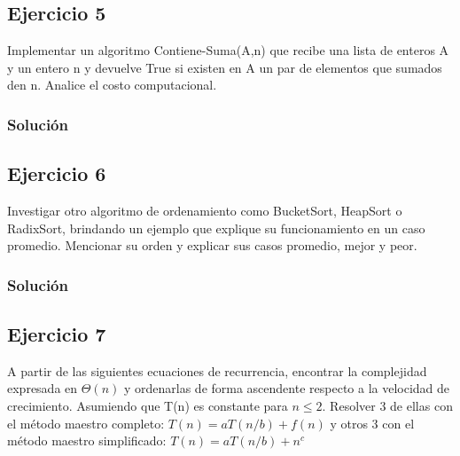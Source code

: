 \documentclass{article}
\begin{document}
\subsection*{Ejercicio 5}
Implementar un algoritmo Contiene-Suma(A,n) que recibe una lista de enteros A y un entero n y devuelve True si existen en A un par de elementos que sumados den n. Analice el costo computacional.

\subsubsection*{Solución}


\subsection*{Ejercicio 6}
Investigar otro algoritmo de ordenamiento como BucketSort, HeapSort o RadixSort, brindando un ejemplo que explique su funcionamiento en un caso promedio. Mencionar su orden y explicar sus casos promedio, mejor y peor.

\subsubsection*{Solución}


\subsection*{Ejercicio 7}
A partir de las siguientes ecuaciones de recurrencia, encontrar la complejidad expresada en $\Theta (n)$ y ordenarlas de forma ascendente respecto a la velocidad de crecimiento. Asumiendo que T(n) es constante para $n \leq 2$. Resolver 3 de ellas con el método maestro completo: $T(n) = a T(n/b) + f(n)$ y otros 3 con el método maestro simplificado: $T(n) = a T(n/b) + n^c$
\end{document}
